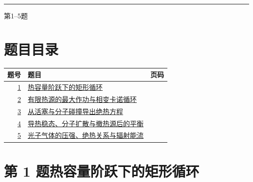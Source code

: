 \documentclass[UTF8,fontset=fandol,a4paper,11pt]{ctexart}
\begin{document}

\thispagestyle{empty}\vspace*{22mm}

\par\vspace{12mm}

\par\vspace{12mm}

\par\vspace{9mm}

\noindent\textcolor{accent}{\rule{\linewidth}{1pt}}\par\vspace{9mm}

\noindent 第1--5题\par\vfill\clearpage

\section*{题目目录}

\begin{longtable}{@{}r p{113mm} r@{}}\toprule 题号 & 题目 & 页码\\\midrule

\hyperref[q:1]{1} & \hyperref[q:1]{热容量阶跃下的矩形循环} & \pageref{q:1} \\

\hyperref[q:2]{2} & \hyperref[q:2]{有限热源的最大作功与相变卡诺循环} & \pageref{q:2} \\

\hyperref[q:3]{3} & \hyperref[q:3]{从活塞与分子碰撞导出绝热方程} & \pageref{q:3} \\

\hyperref[q:4]{4} & \hyperref[q:4]{导热稳态、分子扩散与撤热源后的平衡} & \pageref{q:4} \\

\hyperref[q:5]{5} & \hyperref[q:5]{光子气体的压强、绝热关系与辐射能流} & \pageref{q:5} \\

\bottomrule\end{longtable}

\clearpage


\section*{第 1 题\quad 热容量阶跃下的矩形循环}\label{q:1}
\end{document}
